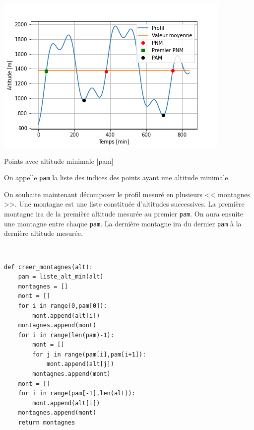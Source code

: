 \ifprof
\else

\begin{marginfigure}
\includegraphics[width=\linewidth]{fig_04}
\caption{Points avec altitude minimale [pam]}
\end{marginfigure}


On appelle \lstinline{pam} la liste des indices des points ayant une altitude minimale.


On souhaite maintenant décomposer le profil mesuré en plusieurs << montagnes >>. 
Une montagne est une liste constituée d'altitudes successives.
La première montagne ira de la première altitude mesurée au premier \lstinline{pam}. 
On aura ensuite une montagne entre chaque \lstinline{pam}. 
La dernière montagne ira du dernier \lstinline{pam} à la dernière altitude mesurée.
\fi


\ifprof
\begin{corrige}~\\
\vspace{-.5cm}
\begin{lstlisting}
def creer_montagnes(alt):
    pam = liste_alt_min(alt)
    montagnes = []
    mont = []
    for i in range(0,pam[0]):
        mont.append(alt[i])
    montagnes.append(mont)
    for i in range(len(pam)-1):
        mont = []
        for j in range(pam[i],pam[i+1]):
            mont.append(alt[j])
        montagnes.append(mont)
    mont = []
    for i in range(pam[-1],len(alt)):
        mont.append(alt[i])
    montagnes.append(mont)
    return montagnes
\end{lstlisting}
\end{corrige}
\else
\fi

